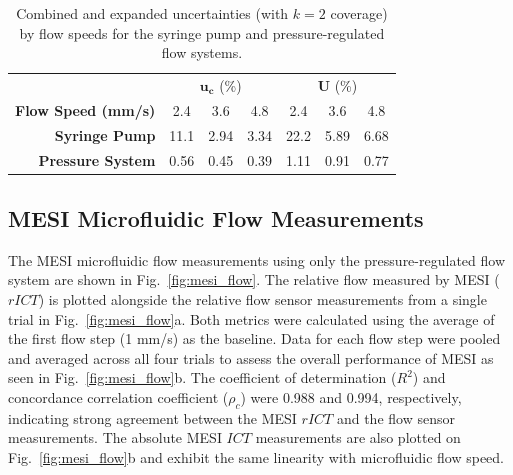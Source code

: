 \documentclass[12pt]{spieman}
\begin{document}
\begin{spacing}{2}
\begin{table}
    \caption {
        Combined and expanded uncertainties (with $k=2$ coverage) by flow speeds for the syringe pump and pressure-regulated flow systems.
    }
    \label{tab:uncertainty_combined}
    \centering
    \begin{tabular}{rcccccc}
        \addlinespace
        \toprule
            &
            \multicolumn{3}{c}{$\boldsymbol{u_c}$ (\%)}     &
            \multicolumn{3}{c}{$\boldsymbol{U}$ (\%)}       \\
            \cmidrule(lr){2-4}
            \cmidrule(lr){5-7}
        \textbf{Flow Speed (mm/s)} & 2.4    & 3.6   & 4.8   & 2.4   & 3.6   & 4.8   \\
        \midrule
        \textbf{Syringe Pump}      & 11.1   & 2.94  & 3.34  & 22.2  & 5.89  & 6.68  \\
        \textbf{Pressure System}   & 0.56   & 0.45  & 0.39  & 1.11  & 0.91  & 0.77  \\
        \bottomrule
    \end{tabular}
\end{table}


\subsection{MESI Microfluidic Flow Measurements}

The MESI microfluidic flow measurements using only the pressure-regulated flow system are shown in Fig.~\ref{fig:mesi_flow}. The relative flow measured by MESI ($rICT$) is plotted alongside the relative flow sensor measurements from a single trial in Fig.~\ref{fig:mesi_flow}a. Both metrics were calculated using the average of the first flow step (1 mm/s) as the baseline. Data for each flow step were pooled and averaged across all four trials to assess the overall performance of MESI as seen in Fig.~\ref{fig:mesi_flow}b. The coefficient of determination ($R^2$) and concordance correlation coefficient ($\rho_c$) \cite{Lin.1989} were 0.988 and 0.994, respectively, indicating strong agreement between the MESI $rICT$ and the flow sensor measurements. The absolute MESI $ICT$ measurements are also plotted on Fig.~\ref{fig:mesi_flow}b and exhibit the same linearity with microfluidic flow speed.


\end{spacing}
\end{document}
